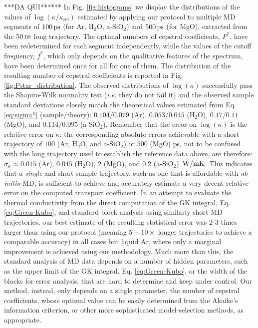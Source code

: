 ***DA QUI******
In Fig. \ref{fig:histograms} we display the distributions of the values of $\log(\kappa/\kappa_{\mathrm{ref}})$ estimated by applying our protocol to multiple MD segments of $100\,\mathrm{ps}$ (for Ar, H$_2$O, a-SiO$_2$) and $500\,\mathrm{ps}$ (for MgO), extracted from the $50\,\mathrm{ns}$ long trajectory. The optimal numbers of cepstral coefficients, $P^*$, have been redetermined for each segment independently, while the values of the cutoff frequency, $f^*$, which only depends on the qualitative features of the spectrum, have been determined once for all for one of them. The distribution of the resulting number of cepstral coefficients is reported in Fig. \ref{fig:Pstar_distribution}. The observed distributions of $\log(\kappa)$ successfully pass the Shapiro-Wilk normality test \cite{Shapiro1965} (\emph{i.e.} they do not fail it) and the observed sample standard deviations closely match the theoretical values estimated from Eq. \eqref{eq:sigma*} (sample/theory):  $0.104/0.079$ (Ar), $0.053/0.045$ (H$_2$O), $0.17/0.11$ (MgO), and $0.114/0.095$ (a-SiO$_2$). Remember that the error on $\log(\kappa)$ is the relative error on $\kappa$: the corresponding absolute errors achievable with a short trajectory of $100$ (Ar, H$_2$O, and a-SiO$_2$) or $500$ (MgO) ps, not to be confused with the long trajectory used to establish the reference data above, are therefore: $\sigma_\kappa \approx 0.015$ (Ar), $0.045$ (H$_2$O), $2$ (MgO), and $0.2$ (a-SiO$_2$) $\,\mathrm{W/mK}$. This indicates that a \emph{single} and short sample trajectory, such as one that is affordable with \emph{ab initio} MD, is sufficient to achieve and accurately estimate a very decent relative error on the computed transport coefficient. In an attempt to evaluate the thermal conductivity from the direct computation of the GK integral, Eq. \eqref{eq:Green-Kubo}, and standard block analysis using similarly short MD trajectories, our best estimate of the resulting statistical error was 2-3 times larger than using our protocol (meaning $5-10\times$ longer trajectories to achieve a comparable accuracy) in all cases but liquid Ar, where only a marginal improvement is achieved using our methodology. Much more than this, the standard analysis of MD data depends on a number of hidden parameters, such as the upper limit of the GK integral, Eq. \eqref{eq:Green-Kubo}, or the width of the blocks for error analysis, that are hard to determine and keep under control. Our method, instead, only depends on a single parameter, the number of cepstral coefficients, whose optimal value can be easily determined from the Akaike's information criterion, or other more sophisticated model-selection methods,\cite{Burnham2004,Claeskens2008} as appropriate.

